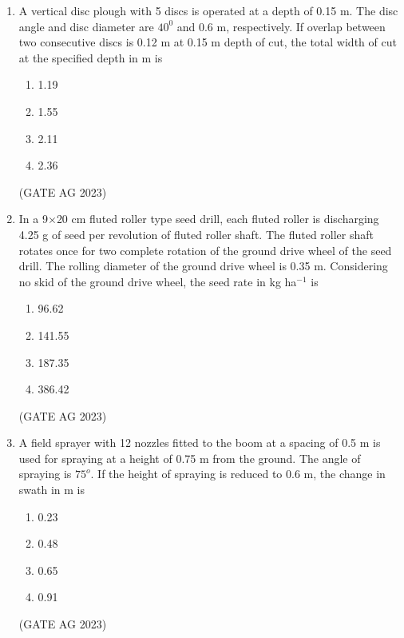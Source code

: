 \documentclass[journal,12pt,onecolumn]{IEEEtran}
\theoremstyle{remark}
\begin{document}
\begin{enumerate}
    \item A vertical disc plough with 5 discs is operated at a depth of 0.15 m. The disc angle and disc diameter are $40^{0}$ and 0.6 m, respectively. If overlap between two consecutive discs is 0.12 m at 0.15 m depth of cut, the total width of cut at the specified depth in m is
    \begin{multicols}{4}
    \begin{enumerate}
        \item 1.19
        \item 1.55
        \item 2.11
        \item 2.36
    \end{enumerate}
    \end{multicols}
\hfill{(GATE AG 2023)}

    \item In a 9$\times$20 cm fluted roller type seed drill, each fluted roller is discharging 4.25 g of seed per revolution of fluted roller shaft. The fluted roller shaft rotates once for two complete rotation of the ground drive wheel of the seed drill. The rolling diameter of the ground drive wheel is 0.35 m. Considering no skid of the ground drive wheel, the seed rate in kg ha$^{-1}$ is
    \begin{multicols}{4}
    \begin{enumerate}
        \item 96.62
        \item 141.55
        \item 187.35
        \item 386.42
    \end{enumerate}
    \end{multicols}
\hfill{(GATE AG 2023)}

    \item A field sprayer with 12 nozzles fitted to the boom at a spacing of 0.5 m is used for spraying at a height of 0.75 m from the ground. The angle of spraying is $75^{o}$. If the height of spraying is reduced to 0.6 m, the change in swath in m is
    \begin{multicols}{4}
    \begin{enumerate}
        \item 0.23
        \item 0.48
        \item 0.65
        \item 0.91
    \end{enumerate}
    \end{multicols}
\hfill{(GATE AG 2023)}


\end{enumerate}
\end{document}
